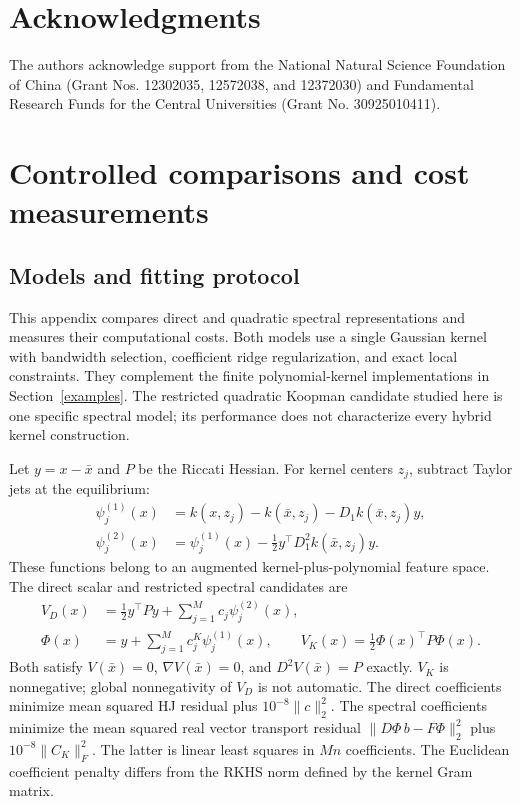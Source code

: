 \documentclass[11pt]{article}
\theoremstyle{plain}      %
\theoremstyle{definition} %
\begin{document}
\section*{Acknowledgments}	
The authors acknowledge support from the National Natural Science Foundation of China (Grant Nos. 12302035, 12572038, and 12372030) and Fundamental Research Funds for the Central Universities (Grant No. 30925010411).

\clearpage
\appendix
\section{Controlled comparisons and cost measurements}\label{app:additional}
\subsection{Models and fitting protocol}\label{app:protocol}
This appendix compares direct and quadratic spectral representations and measures their computational costs. Both models use a single Gaussian kernel with bandwidth selection, coefficient ridge regularization, and exact local constraints. They complement the finite polynomial-kernel implementations in Section~\ref{examples}. The restricted quadratic Koopman candidate studied here is one specific spectral model; its performance does not characterize every hybrid kernel construction.

Let $y=x-\bar x$ and $P$ be the Riccati Hessian. For kernel centers $z_j$, subtract Taylor jets at the equilibrium:
\begin{align}
 \psi_j^{(1)}(x)&=k(x,z_j)-k(\bar x,z_j)-D_1k(\bar x,z_j)y,\\
 \psi_j^{(2)}(x)&=\psi_j^{(1)}(x)-\tfrac12y^\top D_1^2k(\bar x,z_j)y.
\end{align}
These functions belong to an augmented kernel-plus-polynomial feature space. The direct scalar and restricted spectral candidates are
\begin{align}\label{eq:appendix-models}
 V_D(x)&=\tfrac12y^\top Py+\sum_{j=1}^M c_j\psi_j^{(2)}(x),\\
 \Phi(x)&=y+\sum_{j=1}^M c_j^K\psi_j^{(1)}(x),\qquad
 V_K(x)=\tfrac12\Phi(x)^\top P\Phi(x).
\end{align}
Both satisfy $V(\bar x)=0$, $\nabla V(\bar x)=0$, and $D^2V(\bar x)=P$ exactly. $V_K$ is nonnegative; global nonnegativity of $V_D$ is not automatic. The direct coefficients minimize mean squared HJ residual plus $10^{-8}\|c\|_2^2$. The spectral coefficients minimize the mean squared real vector transport residual $\|D\Phi\,b-F\Phi\|_2^2$ plus $10^{-8}\|C_K\|_F^2$. The latter is linear least squares in $Mn$ coefficients. The Euclidean coefficient penalty differs from the RKHS norm defined by the kernel Gram matrix.
\end{document}
